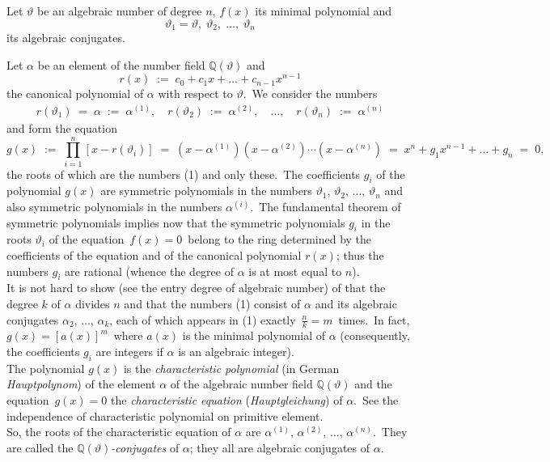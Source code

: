 \documentclass[12pt]{article}
\theoremstyle{definition}
\begin{document}
Let $\vartheta$ be an algebraic number of degree $n$, $f(x)$ its minimal polynomial and
$$\vartheta_1 = \vartheta,\; \vartheta_2,\; \ldots,\; \vartheta_n$$
its algebraic conjugates.

Let $\alpha$ be an element of the number field $\mathbb{Q}(\vartheta)$ and 
$$r(x) \;:=\; c_0+c_1x+\ldots+c_{n-1}x^{n-1}$$
the canonical polynomial of $\alpha$ with respect to $\vartheta$.\, We consider the numbers
\begin{align}
r(\vartheta_1) \;=\; \alpha \;:=\; \alpha^{(1)},\quad r(\vartheta_2) \;:=\; \alpha^{(2)},\quad 
\ldots,\quad r(\vartheta_n) \;:=\; \alpha^{(n)}
\end{align}
and form the equation
$$
g(x) \;:=\; \prod_{i=1}^n[x\!-\!r(\vartheta_i)] \;=\; (x\!-\!\alpha^{(1)})(x\!-\!\alpha^{(2)})\cdots(x\!-\!\alpha^{(n)}) 
\;=\; x^n\!+\!g_1x^{n-1}\!+\!\ldots\!+\!g_n \;=\; 0,
$$
the roots of which are the numbers (1) and only these.\, The coefficients $g_i$ of the polynomial $g(x)$ are symmetric polynomials in the numbers $\vartheta_1,\, \vartheta_2,\, \ldots,\, \vartheta_n$ and also symmetric polynomials in the numbers $\alpha^{(i)}$.\, The fundamental theorem of symmetric polynomials implies now that the symmetric polynomials $g_i$ in the roots $\vartheta_i$ of the equation \,$f(x) = 0$\, belong to the ring determined by the coefficients of the equation and of the canonical polynomial $r(x)$; thus the numbers $g_i$ are rational (whence the degree of $\alpha$ is at most equal to $n$).\\

It is not hard to show (see the entry degree of algebraic number) of that the degree $k$ of $\alpha$ divides $n$ and that the numbers (1) consist of $\alpha$ and its algebraic conjugates $\alpha_2,\,\ldots,\,\alpha_k$, each of which appears in (1) exactly\, $\frac{n}{k} = m$\, times.\, In fact,\, $g(x) = [a(x)]^m$\, where $a(x)$ is the minimal polynomial of $\alpha$ (consequently, the coefficients 
$g_i$ are integers if $\alpha$ is an algebraic integer).\\

The polynomial $g(x)$ is the \emph{characteristic polynomial} (in German \emph{Hauptpolynom}) of the element $\alpha$ of the algebraic number field $\mathbb{Q}(\vartheta)$ and the equation\, $g(x) = 0$ the \emph{characteristic equation} (\emph{Hauptgleichung}) of $\alpha$.\, See the independence of characteristic polynomial on primitive element. \\

So, the roots of the characteristic equation of $\alpha$ are $\alpha^{(1)},\,\alpha^{(2)},\,\ldots,\,\alpha^{(n)}$.\, They are called the $\mathbb{Q}(\vartheta)$\emph{-conjugates} of $\alpha$; they all are algebraic conjugates of 
$\alpha$.


\end{document}
